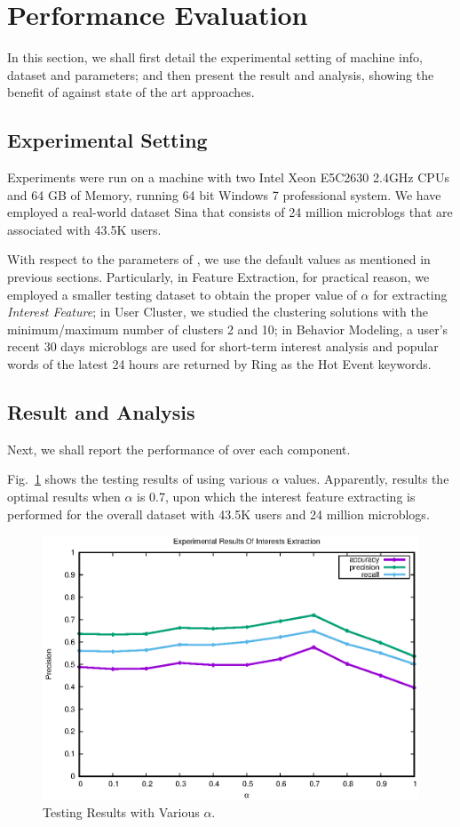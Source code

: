 \section{Performance Evaluation}
\label{sec:perf}

In this section, we shall first detail the experimental setting of machine info, dataset and parameters; and then present the result and analysis, showing the benefit of \sys{} against state of the art approaches.

\subsection{Experimental Setting}

Experiments were run on a machine with two Intel Xeon E5C2630 2.4GHz CPUs and 64 GB of Memory, running 64 bit Windows 7 professional system.
%
We have employed a real-world dataset Sina that consists of 24 million microblogs that are associated with 43.5K users.

With respect to the parameters of \sys{}, we use the default values as mentioned in previous sections.
Particularly, in Feature Extraction, for practical reason, we employed a smaller testing dataset to obtain the proper value of $\alpha$ for extracting \textit{Interest Feature};
in User Cluster, we studied the clustering solutions with the minimum/maximum number of clusters 2 and 10;
in Behavior Modeling, a user's recent 30 days microblogs are used for short-term interest analysis and popular words of the latest 24 hours are returned by Ring as the Hot Event keywords.

\subsection{Result and Analysis}
Next, we shall report the performance of \sys{} over each component.

%
Fig.\ \ref{fig:fe} shows the testing results of using various $\alpha$ values.
Apparently, \sys{} results the optimal results when $\alpha$ is 0.7, upon which the interest feature extracting is performed for the overall dataset with 43.5K users and 24 million microblogs.

\begin{figure}[!htb]
\centering
\includegraphics[width=.7\linewidth]{figures/Interests}
\caption{Testing Results with Various $\alpha$.}
\label{fig:fe}
\end{figure}


